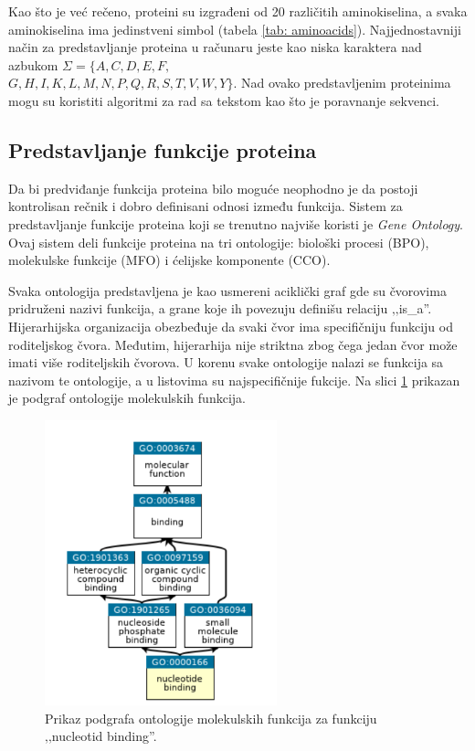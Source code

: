 
Kao što je već rečeno, proteini su izgrađeni od 20 različitih aminokiselina, a svaka aminokiselina ima jedinstveni simbol (tabela \ref{tab: aminoacids}). Najjednostavniji način za predstavljanje proteina u računaru jeste kao niska karaktera nad azbukom $\Sigma = \{A, C, D, E, F,$ \\ $ G, H, I, K, L, M, N, P, Q, R, S, T, V, W, Y\}$. Nad ovako predstavljenim proteinima mogu su koristiti algoritmi za rad sa tekstom kao što je poravnanje sekvenci. \cite{radivojac}


\subsection{Predstavljanje funkcije proteina}

Da bi predviđanje funkcija proteina bilo moguće neophodno je da postoji kontrolisan rečnik i dobro definisani odnosi između funkcija. Sistem za predstavljanje funkcije proteina koji se trenutno najviše koristi je \textit{Gene Ontology}. Ovaj sistem deli funkcije proteina na tri ontologije: biološki procesi (BPO), molekulske funkcije (MFO) i ćelijske komponente (CCO). 


Svaka ontologija predstavljena je kao usmereni aciklički graf gde su čvorovima pridruženi nazivi funkcija, a grane koje ih povezuju definišu relaciju ‚‚is\_a''. Hijerarhijska organizacija obezbeđuje da svaki čvor ima specifičniju funkciju od roditeljskog čvora. Međutim, hijerarhija nije striktna zbog čega jedan čvor može imati više roditeljskih čvorova. U korenu svake ontologije nalazi se funkcija sa nazivom te ontologije, a u listovima su najspecifičnije fukcije. Na slici \ref{fig:subgraph} prikazan je podgraf ontologije molekulskih funkcija. \cite{doktJK, GO}


\begin{figure}[h]
	\centering
	\includegraphics[width=0.6\textwidth]{Figures/go_subgraph.png}
	\caption{Prikaz podgrafa ontologije molekulskih funkcija za funkciju ‚‚nucleotid binding''.}
	\label{fig:subgraph}
\end{figure}


